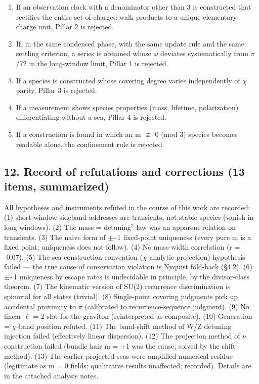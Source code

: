 \documentclass[
]{article}
\providecommand{\tightlist}{%
  \setlength{\itemsep}{0pt}\setlength{\parskip}{0pt}}
\begin{document}
\begin{enumerate}
\def\labelenumi{\arabic{enumi}.}
\tightlist
\item
  If an observation clock with a denominator other than 3 is constructed
  that rectifies the entire set of charged-walk products to a unique
  elementary-charge unit, Pillar 2 is rejected.
\item
  If, in the same condensed phase, with the same update rule and the
  same settling criterion, a series is obtained whose \(\omega\)
  deviates systematically from \(\pi\)/72 in the long-window limit,
  Pillar 1 is rejected.
\item
  If a species is constructed whose covering degree varies independently
  of \(\chi\) parity, Pillar 3 is rejected.
\item
  If a measurement shows species properties (mass, lifetime,
  polarization) differentiating without a sea, Pillar 4 is rejected.
\item
  If a construction is found in which an m \(\not\equiv\) 0 (mod 3)
  species becomes readable alone, the confinement rule is rejected.
\end{enumerate}

\subsection{12. Record of refutations and corrections (13 items,
summarized)}\label{record-of-refutations-and-corrections-13-items-summarized}

All hypotheses and instruments refuted in the course of this work are
recorded: (1) short-window sideband addresses are transients, not stable
species (vanish in long windows). (2) The mass = detuning\(^2\) law was
an apparent relation on transients. (3) The naive form of
\(\pm\)\textasciitilde1 fixed-point uniqueness (every pure m is a fixed
point; uniqueness does not follow). (4) No mass-width correlation (r =
-0.07). (5) The sea-construction convention (\(\chi\)-analytic
projection) hypothesis failed --- the true cause of conservation
violation is Nyquist fold-back (§4.2). (6) \(\pm\)\textasciitilde1
uniqueness by escape rates is undecidable in principle, by the
divisor-class theorem. (7) The kinematic version of SU(2) recurrence
discrimination is spinorial for all states (trivial). (8) Single-point
covering judgments pick up accidental proximity to \(\pi\) (calibrated
to recurrence-sequence judgment). (9) No linear \(\ell\) = 2 slot for
the graviton (reinterpreted as composite). (10) Generation =
\(\chi\)-band position refuted. (11) The band-shift method of W/Z
detuning injection failed (effectively linear dispersion). (12) The
projection method of \(\nu\) construction failed (bundle hair m = +1 was
the cause; solved by the shift method). (13) The earlier projected seas
were amplified numerical residue (legitimate as m = 0 fields;
qualitative results unaffected; recorded). Details are in the attached
analysis notes.
\end{document}
